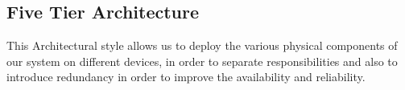 \subsection{Five Tier Architecture}
\label{subsect:Five Tier Architecture}
This Architectural style allows us to deploy the various physical components of our system on different devices, in order to separate responsibilities and also to introduce redundancy in order to improve the availability and reliability. 

